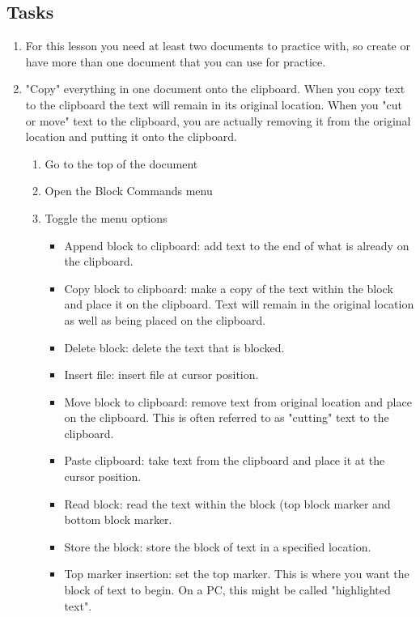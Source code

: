 \documentclass[10pt,letterpaper,twoside]{report}
\begin{document}
\subsection{Tasks}
\begin{enumerate}
	\item For this lesson you need at least two documents to practice with, so create or have more than one document that you can use for practice.
	\item "Copy" everything in one document onto the clipboard. When you copy text to the clipboard the text will remain in its original location. When you "cut or move" text to the clipboard, you are actually removing it from the original location and putting it onto the clipboard.
	      \begin{enumerate}
		      \item Go to the top of the document 
		      \item Open the Block Commands menu 
		      \item Toggle the menu options 
		            \begin{itemize}
			            \item Append block to clipboard: add text to the end of what is already on the clipboard.
			            \item Copy block to clipboard: make a copy of the text within the block and place it on the clipboard. Text will remain in the original location as well as being placed on the clipboard.
			            \item Delete block: delete the text that is blocked.
			            \item Insert file: insert file at cursor position.
			            \item Move block to clipboard: remove text from original location and place on the clipboard. This is often referred to as "cutting" text to the clipboard.
			            \item Paste clipboard: take text from the clipboard and place it at the cursor position.
			            \item Read block: read the text within the block (top block marker and bottom block marker.
			            \item Store the block: store the block of text in a specified location.
			            \item Top marker insertion: set the top marker. This is where you want the block of text to begin. On a PC, this might be called "highlighted text".

\end{itemize}
\end{enumerate}
\end{enumerate}
\end{document}
